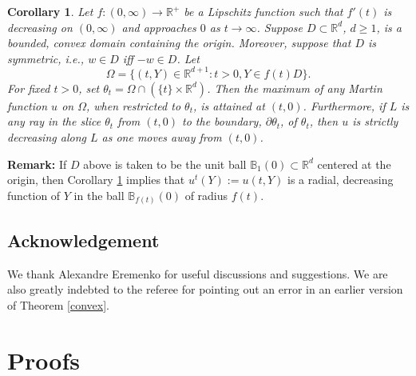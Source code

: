 \documentclass[11pt]{amsart}
\newtheorem{cor}[thm]{Corollary}
\theoremstyle{definition}
\theoremstyle{remark}
\begin{document}
\begin{cor}\label{slice}
Let $f:(0,\infty)\longrightarrow\mathbb{R}^{+}$ be a Lipschitz function such that $f'(t)$ is decreasing on $(0, \infty)$ and approaches $0$ as $t\to\infty$. Suppose $D\subset\mathbb{R}^{d}$, $d\geq 1$, is a bounded, convex domain containing the origin. Moreover, suppose that $D$ is symmetric, i.e., $w\in D$ iff 
$-w\in D$. Let $$\Omega = \{(t,Y)\in\mathbb{R}^{d+1}: t>0, Y\in f(t)D\}.$$  For fixed $t>0$, set $\theta_t = \Omega\cap\left(\{t\}\times\mathbb{R}^d\right)$. Then the maximum of any Martin function $u$ on $\Omega$, when restricted to $\theta_t$, is attained at $(t,0)$. Furthermore, if $L$ is any ray in the slice $\theta_t$ from $(t,0)$ to the boundary, $\partial\theta_t$, of $\theta_t$, then $u$ is strictly decreasing along $L$ as one moves away from $(t,0)$.
\end{cor}

\noindent \textbf{Remark:} If $D$ above is taken to be the unit ball $\mathbb{B}_{1}(0)\subset\mathbb{R}^{d}$ centered at the origin, then Corollary \ref{slice} implies that $u^t(Y):=u(t, Y)$ is a radial, decreasing function of $Y$ in the ball $\mathbb{B}_{f(t)}(0)$ of radius $f(t)$.

\subsection*{Acknowledgement}
We thank Alexandre Eremenko for useful discussions and suggestions.
We are also greatly indebted to the referee for pointing out an error in an earlier version of Theorem \ref{convex}.

\section{Proofs}
\end{document}
